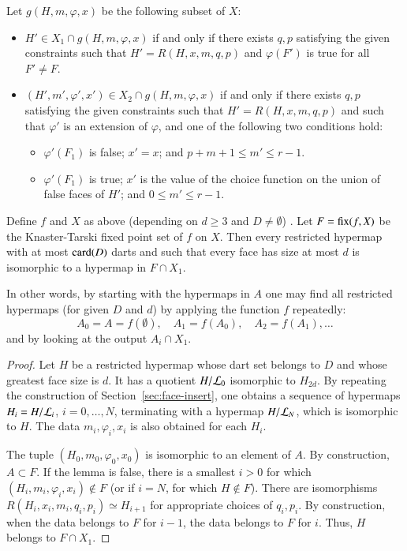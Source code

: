 Let $g(H,m,\varphi,x)$ be the following subset of $X$:
\begin{itemize}
\item $H'\in X_1\cap g(H,m,\varphi,x)$ if and only if there exists
$q,p$ satisfying the given constraints such that $H'=R(H,x,m,q,p)$
and $\varphi(F')$ is true for all $F'\ne F$.
\item $(H',m',\varphi',x')\in X_2\cap g(H,m,\varphi,x)$ if and only if
there exists $q,p$ satisfying the given constraints such that
$H'=R(H,x,m,q,p)$ and such that $\varphi'$ is an extension of
$\varphi$, and one of the following two conditions hold:
\begin{itemize}
\item $\varphi'(F_1)$ is false;  $x' = x$; and  $p+m+1 \le m' \le r-1$.
\item $\varphi'(F_1)$ is true; $x'$ is the value of the choice
function on the union of false faces of $H'$; and $0 \le m' \le
r-1$.
\end{itemize}
\end{itemize}





\begin{lemma}  
Define $f $ and $X$ as above (depending on $d\ge 3$ and $D\ne
\emptyset$) .  Let $F={\operatorname{fix}}(f,X)$ be the Knaster-Tarski fixed
point set of $f$ on $X$.  Then every restricted hypermap with at
most ${\operatorname{card}}(D)$ darts and such that every face has size at most $d$
is isomorphic to a hypermap in $F\cap X_1$.
\end{lemma}
%

In other words, by starting with the  hypermaps in $A$
one may find all restricted hypermaps (for given $D$ and $d$) by
applying the function $f$ repeatedly:
\begin{displaymath}
A_0 = A = f(\emptyset),\quad A_1 = f(A_0),\quad A_2 = f(A_1),\ldots
\end{displaymath}
and by looking at the output $A_i \cap X_1$.
%

\begin{proof} Let $H$ be a restricted hypermap whose dart set belongs
to $D$ and whose greatest face size is $d$.  It has a quotient
$H/{\cal L}_0$ isomorphic to $H_{2d}$.  By repeating the
construction of Section~\ref{sec:face-insert}, one obtains a
sequence of hypermaps $H_i = H/{\cal L}_i$, $i=0,\ldots,N$,
terminating with a hypermap $H/{\cal L}_N$, which is isomorphic to
$H$.  The data $m_i,\varphi_i,x_i$ is also obtained for each $H_i$.

The tuple $(H_0,m_0,\varphi_0,x_0)$ is isomorphic to an element of
$A$.  By construction, $A\subset F$.  If the lemma is false, there
is a smallest $i>0$ for which $(H_i,m_i,\varphi_i,x_i)\not\in F$ (or
if $i=N$, for which $H\not\in F$).  There are isomorphisms
$R(H_i,x_i,m_i,q_i,p_i) \simeq H_{i+1}$ for appropriate choices of
$q_i,p_i$.  By construction, when the data belongs to $F$ for $i-1$,
the data belongs to $F$ for $i$.  Thus, $H$ belongs to $F\cap X_1$.
\end{proof}


